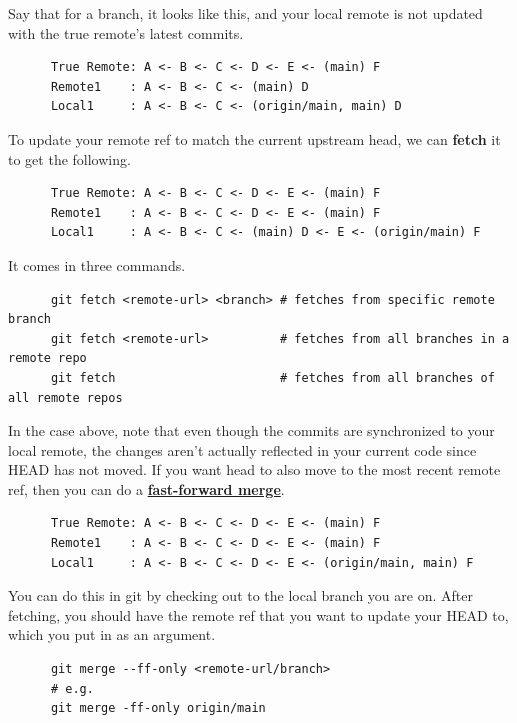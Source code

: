   \begin{definition}[Fetch]
    \label{def:fetch}
 
    Say that for a branch, it looks like this, and your local remote is not updated with the true remote's latest commits. 
    \begin{lstlisting}
      True Remote: A <- B <- C <- D <- E <- (main) F
      Remote1    : A <- B <- C <- (main) D 
      Local1     : A <- B <- C <- (origin/main, main) D
    \end{lstlisting}
    To update your remote ref to match the current upstream head, we can \textbf{fetch} it to get the following. 
    \begin{lstlisting}
      True Remote: A <- B <- C <- D <- E <- (main) F
      Remote1    : A <- B <- C <- D <- E <- (main) F
      Local1     : A <- B <- C <- (main) D <- E <- (origin/main) F
    \end{lstlisting}
    It comes in three commands. 
    \begin{lstlisting}
      git fetch <remote-url> <branch> # fetches from specific remote branch 
      git fetch <remote-url>          # fetches from all branches in a remote repo  
      git fetch                       # fetches from all branches of all remote repos
    \end{lstlisting}
  \end{definition}

  \begin{definition}
    \label{def:fast-forward}
    In the case above, note that even though the commits are synchronized to your local remote, the changes aren't actually reflected in your current code since HEAD has not moved. If you want head to also move to the most recent remote ref, then you can do a \textbf{\hyperref[def:fast-forward-merge]{fast-forward merge}}. 
    \begin{lstlisting}
      True Remote: A <- B <- C <- D <- E <- (main) F
      Remote1    : A <- B <- C <- D <- E <- (main) F
      Local1     : A <- B <- C <- D <- E <- (origin/main, main) F
    \end{lstlisting}
    You can do this in git by checking out to the local branch you are on. After fetching, you should have the remote ref that you want to update your HEAD to, which you put in as an argument. 
    \begin{lstlisting}
      git merge --ff-only <remote-url/branch> 
      # e.g. 
      git merge -ff-only origin/main 
    \end{lstlisting}
  \end{definition}

